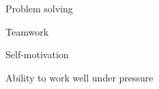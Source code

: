 \cventrytwo
{
{}
\begin{cvitemsone}
{
\item {Problem solving}
\item {Teamwork}
\item {Self-motivation}
\item {Ability to work well under pressure}
}
\end{cvitemsone}
}
